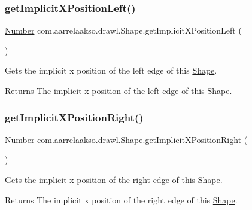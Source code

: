 \subsubsection{\texorpdfstring{get\+Implicit\+X\+Position\+Left()}{getImplicitXPositionLeft()}}
{\footnotesize\ttfamily \hyperlink{interfacecom_1_1aarrelaakso_1_1drawl_1_1_number}{Number} com.\+aarrelaakso.\+drawl.\+Shape.\+get\+Implicit\+X\+Position\+Left (\begin{DoxyParamCaption}{ }\end{DoxyParamCaption})\hspace{0.3cm}{\ttfamily [protected]}}



Gets the implicit x position of the left edge of this \hyperlink{classcom_1_1aarrelaakso_1_1drawl_1_1_shape}{Shape}. 

\begin{DoxyReturn}{Returns}
The implicit x position of the left edge of this \hyperlink{classcom_1_1aarrelaakso_1_1drawl_1_1_shape}{Shape}. 
\end{DoxyReturn}
\mbox{\label{classcom_1_1aarrelaakso_1_1drawl_1_1_shape_a15599ef4ee30a0ddd372f7cf1b155ce1}} 
\subsubsection{\texorpdfstring{get\+Implicit\+X\+Position\+Right()}{getImplicitXPositionRight()}}
{\footnotesize\ttfamily \hyperlink{interfacecom_1_1aarrelaakso_1_1drawl_1_1_number}{Number} com.\+aarrelaakso.\+drawl.\+Shape.\+get\+Implicit\+X\+Position\+Right (\begin{DoxyParamCaption}{ }\end{DoxyParamCaption})\hspace{0.3cm}{\ttfamily [protected]}}



Gets the implicit x position of the right edge of this \hyperlink{classcom_1_1aarrelaakso_1_1drawl_1_1_shape}{Shape}. 

\begin{DoxyReturn}{Returns}
The implicit x position of the right edge of this \hyperlink{classcom_1_1aarrelaakso_1_1drawl_1_1_shape}{Shape}. 
\end{DoxyReturn}
\mbox{\label{classcom_1_1aarrelaakso_1_1drawl_1_1_shape_a8d44b02976656bf4a81055a2dbae66cb}} 
